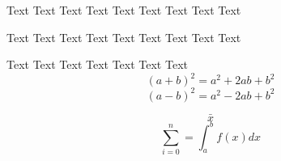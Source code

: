 \documentclass{article}
\begin{document}
Text Text Text Text  Text  Text  Text Text Text

Text  Text  Text  Text Text Text   Text  Text  Text

Text Text Text Text  Text  Text  Text
  \begin{equation} (a+b)^2 = a^2 + 2ab +b^2  \end{equation}
  \begin{equation} (a-b)^2 = a^2 - 2ab + b^2 \end{equation}

  $$
  \bar{x}
  $$
 \begin{equation} \sum_{i=0}^n = \int_a^b f(x)dx \end{equation}
\end{document}
